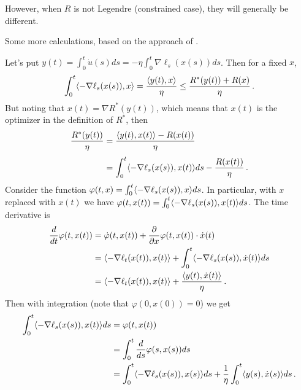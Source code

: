 \documentclass[12pt]{article}
\theoremstyle{plain}
\theoremstyle{definition}
\theoremstyle{remark}
\begin{document}
However, when $R$ is not Legendre (constrained case), they will generally be different.



\newpage

Some more calculations, based on the approach of \cite{Kwon-M}.

\bigskip

\noindent
Let's put 
$\displaystyle y(t) = \int_{0}^{t} \dot{u}(s) ds = -\eta \int_{0}^{t} \nabla\ell_{s}(x(s)) ds$.
Then for a fixed $x$,
\begin{equation}
\int_{0}^{t} \langle {-\nabla\ell_{s}(x(s)), x}\rangle
= \frac{\langle {y(t), x}\rangle}{\eta}
\leq \frac{R^{*}(y(t)) + R(x)}{\eta}\,.
\label{eq.using.fenchel.ineq}
\end{equation}
But noting that $x(t) = \nabla R^{*}(y(t))$, 
which means that $x(t)$ is the optimizer in the definition of $R^{*}$, then
\begin{align}
\frac{R^{*}(y(t))}{\eta}
&= \frac{\langle {y(t), x(t)}\rangle - R(x(t))}{\eta} \notag \\[1mm]
&= \int_{0}^{t} \langle {-\nabla\ell_{s}(x(s)), x(t)}\rangle ds - \frac{R(x(t))}{\eta}\,.
\label{eq.something}
\end{align}
Consider the function $\varphi(t,x) = \int_{0}^{t} \langle {-\nabla\ell_{s}(x(s)), x}\rangle ds$.
In particular, with $x$ replaced with $x(t)$ we have
$\varphi(t,x(t)) = \int_{0}^{t} \langle {-\nabla\ell_{s}(x(s)), x(t)}\rangle ds$.
The time derivative is
\begin{align*}
\frac{d}{dt}\varphi(t,x(t))
&= \dot{\varphi}(t,x(t)) + \frac{\partial}{\partial x} \varphi(t,x(t)) \cdot \dot{x}(t) \\
&= \langle {-\nabla\ell_{t}(x(t)), x(t)}\rangle + \int_{0}^{t} \langle {-\nabla\ell_{s}(x(s)), \dot{x}(t)}\rangle ds \\
&= \langle {-\nabla\ell_{t}(x(t)), x(t)}\rangle + \frac{\langle {y(t), \dot{x}(t)}\rangle}{\eta}\,.
\end{align*}
Then with integration (note that $\varphi(0,x(0)) = 0$) we get
\begin{align*}
\int_{0}^{t} \langle {-\nabla\ell_{s}(x(s)), x(t)}\rangle ds 
&= \varphi(t,x(t)) \\
&= \int_{0}^{t} \frac{d}{ds} \varphi(s,x(s)) ds \\
&= \int_{0}^{t} \langle {-\nabla\ell_{s}(x(s)), x(s)}\rangle ds 
     + \frac{1}{\eta} \int_{0}^{t} \langle {y(s), \dot{x}(s)}\rangle ds\,.
\end{align*}

\end{document}
